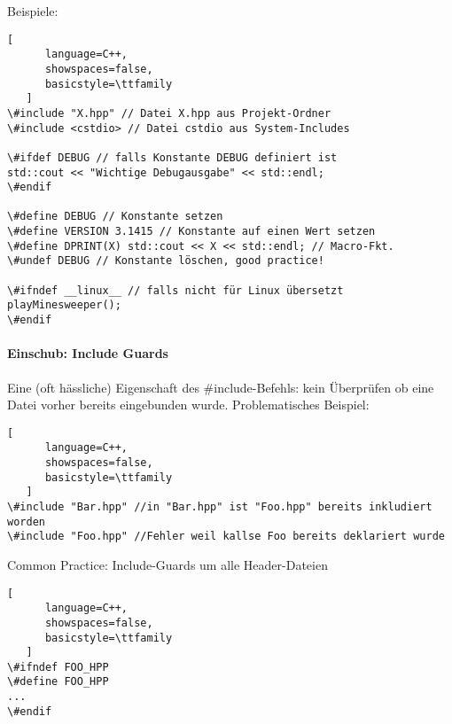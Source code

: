 \documentclass[10pt]{article}
\begin{document}
Beispiele: 
\begin{lstlisting}[
      language=C++,
      showspaces=false,
      basicstyle=\ttfamily
   ]
\#include "X.hpp" // Datei X.hpp aus Projekt-Ordner
\#include <cstdio> // Datei cstdio aus System-Includes

\#ifdef DEBUG // falls Konstante DEBUG definiert ist
std::cout << "Wichtige Debugausgabe" << std::endl;
\#endif

\#define DEBUG // Konstante setzen
\#define VERSION 3.1415 // Konstante auf einen Wert setzen
\#define DPRINT(X) std::cout << X << std::endl; // Macro-Fkt.
\#undef DEBUG // Konstante löschen, good practice!

\#ifndef __linux__ // falls nicht für Linux übersetzt
playMinesweeper();
\#endif
\end{lstlisting}


\paragraph{Einschub: Include Guards}
Eine (oft hässliche) Eigenschaft des \#include-Befehls: kein Überprüfen ob eine Datei vorher bereits eingebunden wurde. Problematisches Beispiel:
\begin{lstlisting}[
      language=C++,
      showspaces=false,
      basicstyle=\ttfamily
   ]
\#include "Bar.hpp" //in "Bar.hpp" ist "Foo.hpp" bereits inkludiert worden
\#include "Foo.hpp" //Fehler weil kallse Foo bereits deklariert wurde
\end{lstlisting}

Common Practice: Include-Guards um alle Header-Dateien
\begin{lstlisting}[
      language=C++,
      showspaces=false,
      basicstyle=\ttfamily
   ]
\#ifndef FOO_HPP
\#define FOO_HPP
...
\#endif
\end{lstlisting}
\end{document}
